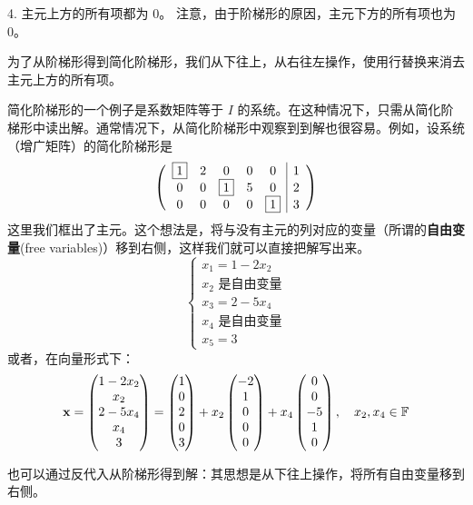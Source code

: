 4. 主元上方的所有项都为 0。
注意，由于阶梯形的原因，主元下方的所有项也为 0。

为了从阶梯形得到简化阶梯形，我们从下往上，从右往左操作，使用行替换来消去主元上方的所有项。

简化阶梯形的一个例子是系数矩阵等于 $I$ 的系统。在这种情况下，只需从简化阶梯形中读出解。通常情况下，从简化阶梯形中观察到到解也很容易。例如，设系统（增广矩阵）的简化阶梯形是
$$
\left(\begin{array}{ccccc|c}
\fbox{$1$} & 2 & 0 & 0 & 0 & 1 \\
0 & 0 & \fbox{$1$} & 5 & 0 & 2 \\
0 & 0 & 0 & 0 & \fbox{$1$} & 3
\end{array}\right)
$$
这里我们框出了主元。这个想法是，将与没有主元的列对应的变量（所谓的\textbf{自由变量}(free variables)）移到右侧，这样我们就可以直接把解写出来。
$$
\begin{cases}
x_1 = 1 - 2x_2 \\
x_2 \text{ 是自由变量} \\
x_3 = 2 - 5x_4 \\
x_4 \text{ 是自由变量} \\
x_5 = 3
\end{cases}
$$
或者，在向量形式下：
$$
\mathbf{x} = \begin{pmatrix} 1 - 2x_2 \\ x_2 \\ 2 - 5x_4 \\ x_4 \\ 3 \end{pmatrix} = \begin{pmatrix} 1 \\ 0 \\ 2 \\ 0 \\ 3 \end{pmatrix} + x_2 \begin{pmatrix} -2 \\ 1 \\ 0 \\ 0 \\ 0 \end{pmatrix} + x_4 \begin{pmatrix} 0 \\ 0 \\ -5 \\ 1 \\ 0 \end{pmatrix}, \quad x_2, x_4 \in \mathbb{F}
$$

也可以通过反代入从阶梯形得到解：其思想是从下往上操作，将所有自由变量移到右侧。


